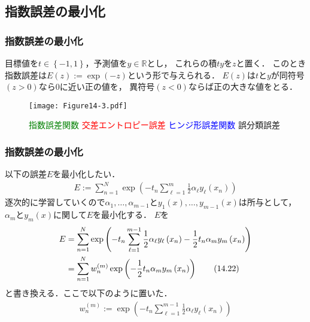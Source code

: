 \documentclass[10pt,hyperref={unicode}]{beamer}
\newcommand{\parentheses}[1]{\left(#1\right)}
\newcommand{\braces}[1]{\left\{#1\right\}}
\begin{document}
\subsection{指数誤差の最小化}
\begin{frame}
\frametitle{指数誤差の最小化}
目標値を$t \in \braces{-1,1}$，予測値を$y \in \mathbb{R}$とし，
これらの積$ty$を$z$と置く．
このとき指数誤差は$E\parentheses{z} := \exp\parentheses{-z}$という形で与えられる．
$E\parentheses{z}$は$t$と$y$が同符号$\parentheses{z > 0}$なら$0$に近い正の値を，
異符号$\parentheses{z < 0}$ならば正の大きな値をとる．

\bigskip

\begin{figure}
\begin{center}
    \texttt{[image: Figure14-3.pdf]}
\end{center}
\caption{\textcolor{green}{指数誤差関数} \textcolor{red}{交差エントロピー誤差} \textcolor{blue}{ヒンジ形誤差関数} 誤分類誤差}
\end{figure}

\end{frame}

\begin{frame}
\frametitle{指数誤差の最小化}
以下の誤差$E$を最小化したい．
\begin{align*}
    E := \sum_{n = 1}^N \exp \parentheses{-t_n\sum_{\ell = 1}^m \frac{1}{2}\alpha_\ell y_\ell\parentheses{x_n}}
\end{align*}
逐次的に学習していくので$\alpha_1,\ldots,\alpha_{m - 1}$と$y_1\parentheses{x},\ldots,y_{m - 1}\parentheses{x}$は所与として，
$\alpha_m$と$y_m\parentheses{x}$に関して$E$を最小化する．
$E$を
\begin{align}
    E
    &= \sum_{n = 1}^N \exp\parentheses{-t_n\sum_{\ell = 1}^{m - 1} \frac{1}{2}\alpha_\ell y_\ell\parentheses{x_n} - \frac{1}{2}t_n\alpha_my_m\parentheses{x_n}} \notag \\
    &= \sum_{n = 1}^N w_n^{\parentheses{m}}\exp\parentheses{-\frac{1}{2}t_n\alpha_my_m\parentheses{x_n}}
    \tag{14.22}
\end{align}
と書き換える．ここで以下のように置いた．
\begin{align}
    w_n^{\parentheses{m}} := \exp\parentheses{-t_n\sum_{\ell = 1}^{m - 1}\frac{1}{2}\alpha_\ell y_\ell \parentheses{x_n}}
    \tag{$14.22'$}
    \label{w}
\end{align}
\end{frame}
\end{document}
